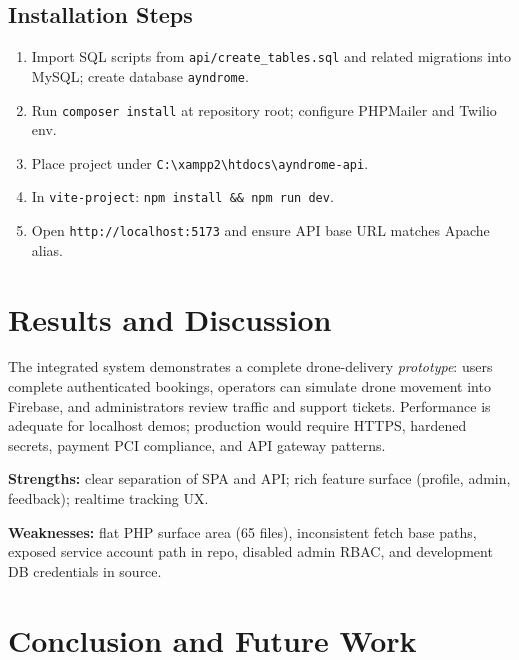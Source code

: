 \documentclass[12pt,a4paper,oneside]{report}
\begin{document}
\section{Installation Steps}
\begin{enumerate}
    \item Import SQL scripts from \texttt{api/create\_tables.sql} and related migrations into
          MySQL; create database \texttt{ayndrome}.
    \item Run \texttt{composer install} at repository root; configure PHPMailer and Twilio env.
    \item Place project under \verb|C:\xampp2\htdocs\ayndrome-api|.
    \item In \texttt{vite-project}: \texttt{npm install \&\& npm run dev}.
    \item Open \texttt{http://localhost:5173} and ensure API base URL matches Apache alias.
\end{enumerate}

\chapter{Results and Discussion}

The integrated system demonstrates a complete drone-delivery \emph{prototype}: users complete
authenticated bookings, operators can simulate drone movement into Firebase, and administrators
review traffic and support tickets. Performance is adequate for localhost demos; production
would require HTTPS, hardened secrets, payment PCI compliance, and API gateway patterns.

\textbf{Strengths:} clear separation of SPA and API; rich feature surface (profile, admin,
feedback); realtime tracking UX.

\textbf{Weaknesses:} flat PHP surface area (65 files), inconsistent fetch base paths, exposed
service account path in repo, disabled admin RBAC, and development DB credentials in source.

\chapter{Conclusion and Future Work}
\end{document}
